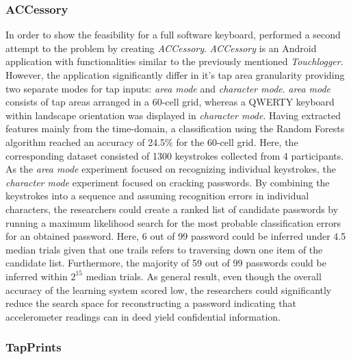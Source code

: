 \subsubsection{ACCessory}

In order to show the feasibility for a full software keyboard, \citeauthor{Accessory} performed a second attempt to the problem by creating \textit{ACCessory}. \textit{ACCessory} is an Android application with functionalities similar to the previously mentioned \textit{Touchlogger}. However, the application significantly differ in it's tap area granularity providing two separate modes for tap inputs: \textit{area mode} and \textit{character mode}. \textit{area mode} consists of tap areas arranged in a 60-cell grid, whereas a QWERTY keyboard within landscape orientation was displayed in \textit{character mode}. Having extracted features mainly from the time-domain, a classification using the Random Forests algorithm reached an accuracy of 24.5\% for the 60-cell grid. Here, the corresponding dataset consisted of 1300 keystrokes collected from 4 participants. As the \textit{area mode} experiment focused on recognizing individual keystrokes, the \textit{character mode} experiment focused on cracking passwords. By combining the keystrokes into a sequence and assuming recognition errors in individual characters, the researchers could create a ranked list of candidate passwords by running a maximum likelihood search for the most probable classification errors for an obtained password. Here, 6 out of 99 password could be inferred under 4.5 median trials given that one trails refers to traversing down one item of the candidate list. Furthermore, the majority of 59 out of 99 passwords could be inferred within $2^{15}$ median trials. As general result, even though the overall accuracy of the learning system scored low, the researchers could significantly reduce the search space for reconstructing a password indicating that accelerometer readings can in deed yield confidential information.

\subsubsection{TapPrints}

